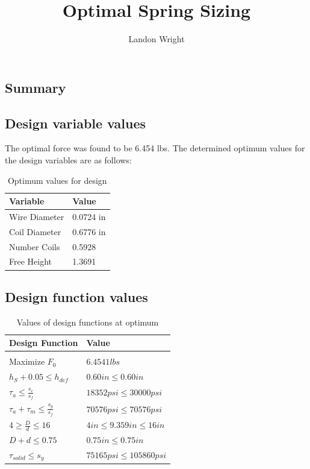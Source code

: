 \documentclass{article}
\begin{document}
\title{Optimal Spring Sizing}
\author{Landon Wright}
\maketitle
\begin{centering}
\section*{Summary}

\end{centering}
\subsection{Design variable values}
The optimal force was found to be 6.454 lbs.
The determined optimum values for the design variables are as follows:

\begin{table}[H]
\centering
\caption{Optimum values for design}
\label{tab:optimum values}
\begin{tabular}{ll}
\hline
\textbf{Variable}      & \textbf{Value} \\
\hline
Wire Diameter & 0.0724 in \\
Coil Diameter & 0.6776 in \\
Number Coils  & 0.5928    \\
Free Height   & 1.3691   \\
\hline
\end{tabular}
\end{table}

\subsection{Design function values}
\begin{table}[H]
\centering
\caption{Values of design functions at optimum}
\label{my-label}
\begin{tabular}{ll}
\hline
\textbf{Design Function}                       & \textbf{Value} \\
\hline\\
Maximize $F_{0}$                               & $6.4541 lbs$                    \\
$h_{S} + 0.05 \leq h_{def}$                    & $0.60 in \leq 0.60 in$          \\
$\tau_{a} \leq \frac{s_{e}}{s_{f}}$            & $18352 psi \leq 30000 psi$      \\
$\tau_{a} + \tau_{m} \leq \frac{s_{y}}{s_{f}}$ & $70576 psi \leq 70576psi$       \\
$4 \geq \frac{D}{d} \leq 16$                   & $4 in \leq 9.359 in \leq 16 in$ \\
$D + d \leq 0.75$                              & $0.75 in \leq 0.75in$           \\
$\tau_{solid} \leq s_{y}$                      & $75165 psi \leq 105860 psi$     \\
\hline  
\end{tabular}
\end{table}
\end{document}
